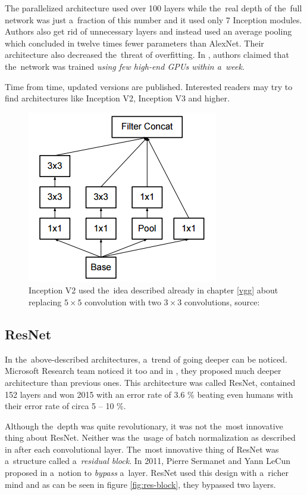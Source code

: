 The parallelized architecture used over 100 layers while the~real depth of
the~full network was just a~fraction of this number and it used only 7
Inception modules. Authors also get rid of unnecessary  layers and
instead used an average pooling which concluded in twelve times fewer
parameters than AlexNet. Their architecture also decreased the~threat of
overfitting. In \cite{googlenet}, authors claimed that the~network was trained
\textit{using few high-end GPUs within a~week}.

Time from time, updated versions are published. Interested readers may try to
find architectures like Inception V2, Inception V3 and higher.

\begin{figure}[H]
   \centering
	\includegraphics[width=0.3\linewidth]{./pictures/inception-v2.png}
	\caption[Inception V2]{Inception V2 used the~idea described already in chapter
	\ref{vgg} about replacing $5 \times 5$ convolution with two $3 \times 3$ 
	convolutions, source: \cite{inception-v2}}
      \label{fig:inception-v2}
\end{figure}


\subsection{ResNet}
\label{resnet}

In the~above-described architectures, a~trend of going deeper can be noticed. 
Microsoft Research team noticed it too and in \cite{resnet}, they proposed much
deeper architecture than previous ones. This architecture was called ResNet, 
contained 152 layers and won  2015 with an error rate of 3.6 \% 
beating even humans with their error rate of circa 5 -- 10 \%.

Although the~depth was quite revolutionary, it was not the~most innovative
thing about ResNet. Neither was the~usage of batch normalization as described
in \cite{batch-norm} after each convolutional layer. The~most innovative thing
of ResNet was a~structure called a~\textit{residual block}. In 2011, Pierre 
Sermanet and Yann LeCun proposed in \cite{bypass} a~notion to \textit{bypass}
a~layer. ResNet used this design with a~richer mind and as can be seen in
figure \ref{fig:res-block}, they bypassed two layers.

